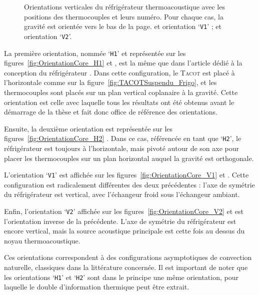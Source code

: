 \begin{figure}[!htp]
\begin{subfigure}[c]{.4\textwidth}
		\caption{}
		\label{fig:OrientationCore_V2_Schema}
	\end{subfigure} 	
 	\caption{Orientations verticales du réfrigérateur thermoacoustique avec les positions des thermocouples et leurs numéro. Pour chaque cas, la gravité est orientée vers le bas de la page.  et  orientation `\texttt{V1}' ;  et  orientation  `\texttt{V2}'.}%
    \label{fig:OrientationCore_V} %
\end{figure}


La première orientation, nommée `\texttt{H1}' et représentée sur les figures~\ref{fig:OrientationCore_H1} et , est la même que dans l'article dédié à la conception du réfrigérateur \cite{ramadan_design_2021}. Dans cette configuration, le \textsc{Tacot} est placé à l'horizontale comme sur la figure~\ref{fig:TACOTSuspendu_Frigo}, et les thermocouples sont placés sur un plan vertical coplanaire à la gravité. Cette orientation est celle avec laquelle tous les résultats ont été obtenus avant le démarrage de la thèse et fait donc office de référence des orientations.\smallskip

Ensuite, la deuxième orientation est représentée sur les figures~\ref{fig:OrientationCore_H2} . Dans ce cas, référencée en tant que `\texttt{H2}', le réfrigérateur est toujours à l'horizontale, mais pivoté autour de son axe pour placer les thermocouples sur un plan horizontal auquel la gravité est orthogonale.\smallskip

L'orientation `\texttt{V1}' est affichée sur les figures~\ref{fig:OrientationCore_V1} et . Cette configuration est radicalement différentes des deux précédentes : l'axe de symétrie du réfrigérateur est vertical, avec l'échangeur froid sous l'échangeur ambiant.\smallskip

Enfin, l'orientation `\texttt{V2}' affichée sur les figures~\ref{fig:OrientationCore_V2} et  est l'orientation inverse de la précédente. L'axe de symétrie du réfrigérateur est encore vertical, mais la source acoustique principale est cette fois au dessus du noyau thermoacoustique.\medskip

Ces orientations correspondent à des configurations asymptotiques de convection naturelle, classiques dans la littérature concernée. Il est important de noter que les orientations `\texttt{H1}' et `\texttt{H2}' sont dans le principe une même orientation, pour laquelle le double d'information thermique peut être extrait.

